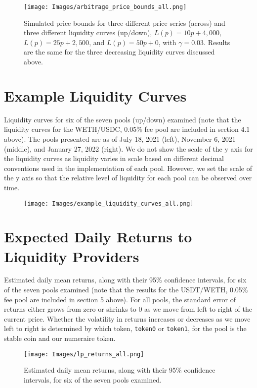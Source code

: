 \documentclass[11pt]{article}
\begin{document}
\begin{appendices}
\begin{figure}[H]
    \centering
    \texttt{[image: Images/arbitrage\_price\_bounds\_all.png]}
    \caption{Simulated price bounds for three different price series (across) and three different liquidity curves (up/down), $L(p) = 10p + 4,000$, $L(p) = 25p + 2,500$, and $L(p) = 50p + 0$, with $\gamma = 0.03$. Results are the same for the three decreasing liquidity curves discussed above.}
    \label{fig:all_price_bound_simulation}
\end{figure}

\section{Example Liquidity Curves}\label{sec:10}
Liquidity curves for six of the seven pools (up/down) examined (note that the liquidity curves for the WETH/USDC, 0.05\% fee pool are included in section 4.1 above). The pools presented are as of July 18, 2021 (left), November 6, 2021 (middle), and January 27, 2022 (right). We do not show the scale of the y axis for the liquidity curves as liquidity varies in scale based on different decimal conventions used in the implementation of each pool. However, we set the scale of the y axis so that the relative level of liquidity for each pool can be observed over time.

\begin{figure}[H]
    \centering
    \texttt{[image: Images/example\_liquidity\_curves\_all.png]}
    \label{fig:example_liquidity_curves_all}
\end{figure}

\section{Expected Daily Returns to Liquidity Providers}\label{sec:11}
Estimated daily mean returns, along with their 95\% confidence intervals, for six of the seven pools examined (note that the results for the USDT/WETH, 0.05\% fee pool are included in section 5 above). For all pools, the standard error of returns either grows from zero or shrinks to 0 as we move from left to right of the current price. Whether the volatility in returns increases or decreases as we move left to right is determined by which token, \texttt{token0} or \texttt{token1}, for the pool is the stable coin and our numeraire token.

\begin{figure}[H]
    \centering
    \texttt{[image: Images/lp\_returns\_all.png]}
    \caption{Estimated daily mean returns, along with their 95\% confidence intervals, for six of the seven pools examined.}
    \label{fig:mean_returns_all}
\end{figure}

\end{appendices}
\end{document}
